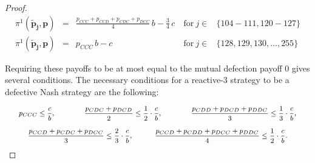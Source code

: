\documentclass[11pt]{article}
\theoremstyle{plainCl1}
\theoremstyle{plainCl2}
\begin{document}
\begin{proof}
\begin{equation*}
\begin{array}{lclll}
  \pi^1(\mathbf{\tilde p_j},\mathbf{p}) &= 
  &\displaystyle \frac{p_{CCC} + p_{CCD} + p_{CDC} + p_{DCC}}{4} \, b - \frac{3}{4} \, c
  &~\text{for}~ j\! \in\! 
  & \{ 104\!-\!111, 120\!- \!127\} \\ [0.2cm]
  
  \pi^1(\mathbf{\tilde p_j},\mathbf{p}) &= 
  &\displaystyle p_{CCC} \, b - c
  &~\text{for}~ j\! \in\! 
  & \{128, 129, 130, \dots, 255\}
  \end{array}
  \end{equation*}
  
  \noindent
  Requiring these payoffs to be at most  equal to the mutual defection payoff 0
  gives several conditions. The necessary conditions for a reactive-3 strategy
  to be a defective Nash strategy are the following:

  \begin{equation*} \footnotesize
  \begin{array}{c}
  \displaystyle  p_{CCC} \leq \frac{c}{b}, 
    \qquad \qquad \frac{p_{CDC} + p_{DCD}}{2} \leq \frac{1}{2} \cdot \frac{c}{b}, 
    \qquad \qquad \frac{p_{CDD} + p_{DCD} + p_{DDC}}{3} \leq \frac{1}{3} \cdot \frac{c}{b},\\[0.45cm]
  \displaystyle  \frac{p_{CCD} + p_{CDC} + p_{DCC}}{3} \leq \frac{2}{3} \cdot \frac{c}{b},
    \quad \qquad \frac{p_{CCD} + p_{CDD} + p_{DCC} + p_{DDC}}{4} \leq \frac{1}{2}  \cdot \frac{c}{b}.
    \end{array}
  \end{equation*}
  \end{proof}
  
\end{document}

